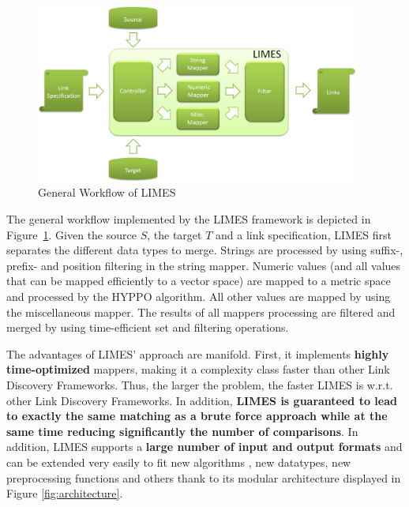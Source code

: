 \documentclass[a4paper, 11pt]{article}
\begin{document}
    \begin{figure}[ht!]
      \centering
      \includegraphics[width = 0.95\textwidth]{images/workflow.png}
      \caption{General Workflow of LIMES}
      \label{fig:workflow}
    \end{figure}

The general workflow implemented by the LIMES framework is depicted in Figure~\ref{fig:workflow}.
Given the source $S$, the target $T$ and a link specification, LIMES first separates the different data types to merge.
Strings are processed by using suffix-, prefix- and position filtering in the string mapper.
Numeric values (and all values that can be mapped efficiently to a vector space) are mapped to a metric space and processed by the HYPPO algorithm.
All other values are mapped by using the miscellaneous mapper.
The results of all mappers processing are filtered and merged by using time-efficient set and filtering operations.

The advantages of LIMES' approach are manifold.
First, it implements \textbf{highly time-optimized} mappers, making it a complexity class faster than other Link Discovery Frameworks. Thus, the larger the problem, the faster LIMES is w.r.t. other Link Discovery Frameworks. In addition, \textbf{LIMES is guaranteed to lead to exactly the same matching as a brute force approach while at the same time reducing significantly the number of comparisons}. In addition, LIMES supports a \textbf{large number of input and output formats} and can be extended very easily to fit new algorithms , new datatypes, new preprocessing functions and others thank to its modular architecture displayed in Figure \ref{fig:architecture}.
\end{document}
